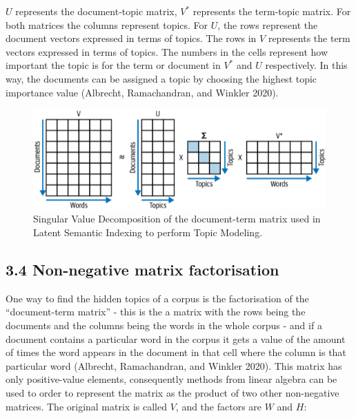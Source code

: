 \documentclass[
]{article}
\begin{document}
\(U\) represents the document-topic matrix, \(V^*\) represents the
term-topic matrix. For both matrices the columns represent topics. For
\(U\), the rows represent the document vectors expressed in terms of
topics. The rows in \(V\) represents the term vectors expressed in terms
of topics. The numbers in the cells represent how important the topic is
for the term or document in \(V^*\) and \(U\) respectively. In this way,
the documents can be assigned a topic by choosing the highest topic
importance value (Albrecht, Ramachandran, and Winkler 2020).

\begin{figure}

{\centering \includegraphics[width=1\linewidth]{images/lsa} 

}

\caption{Singular Value Decomposition of the document-term matrix used in Latent Semantic Indexing to perform Topic Modeling.}\label{fig:lsa_svd}
\end{figure}

\hypertarget{non-negative-matrix-factorisation}{%
\subsection{3.4 Non-negative matrix
factorisation}\label{non-negative-matrix-factorisation}}

One way to find the hidden topics of a corpus is the factorisation of
the ``document-term matrix'' - this is the a matrix with the rows being
the documents and the columns being the words in the whole corpus - and
if a document contains a particular word in the corpus it gets a value
of the amount of times the word appears in the document in that cell
where the column is that particular word (Albrecht, Ramachandran, and
Winkler 2020). This matrix has only positive-value elements,
consequently methods from linear algebra can be used to order to
represent the matrix as the product of two other non-negative matrices.
The original matrix is called \(V\), and the factors are \(W\) and
\(H\):
\end{document}
